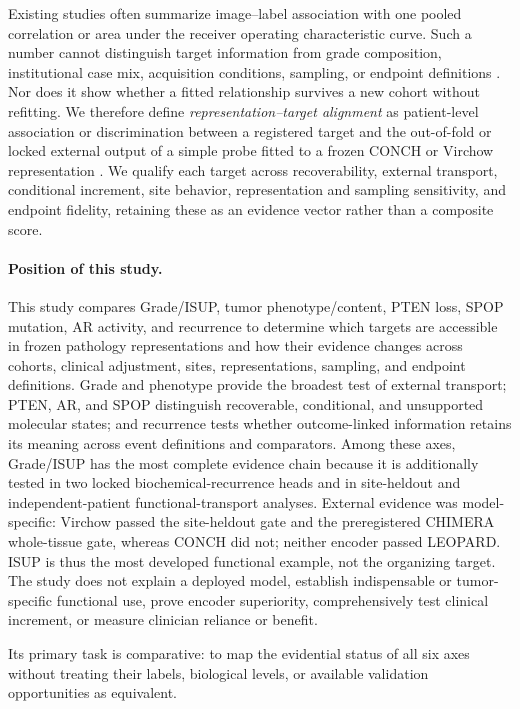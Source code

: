 Existing studies often summarize image--label association with one pooled correlation or
area under the receiver operating characteristic curve. Such a number cannot distinguish
target information from grade composition, institutional case mix, acquisition conditions,
sampling, or endpoint definitions \cite{dawood2026,neidlinger2025,pathorob2026}. Nor does it
show whether a fitted relationship survives a new cohort without refitting. We therefore
define \emph{representation--target alignment} as patient-level association or
discrimination between a registered target and the out-of-fold or locked external output of
a simple probe fitted to a frozen CONCH or Virchow representation
\cite{conch2023,virchow2023}. We qualify each target across recoverability, external transport,
conditional increment, site behavior, representation and sampling sensitivity, and endpoint
fidelity, retaining these as an evidence vector rather than a composite score.

\paragraph{Position of this study.}
This study compares Grade/ISUP, tumor phenotype/content, PTEN loss, SPOP mutation, AR
activity, and recurrence to determine which targets are accessible in frozen pathology
representations and how their evidence changes across cohorts, clinical adjustment, sites,
representations, sampling, and endpoint definitions. Grade and phenotype provide the
broadest test of external transport; PTEN, AR, and SPOP distinguish recoverable, conditional,
and unsupported molecular states; and recurrence tests whether outcome-linked information
retains its meaning across event definitions and comparators. Among these axes, Grade/ISUP
has the most complete evidence chain because it is additionally tested in two locked
biochemical-recurrence heads and in site-heldout and independent-patient functional-transport
analyses. External evidence was model-specific: Virchow passed the
site-heldout gate and the preregistered CHIMERA whole-tissue gate, whereas CONCH did not; neither
encoder passed LEOPARD. ISUP is thus the most developed functional example, not the organizing
target. The study does not explain a deployed model, establish indispensable or tumor-specific
functional use, prove encoder superiority, comprehensively test clinical increment, or measure
clinician reliance or benefit.

Its primary task is comparative: to map the evidential status of all six axes without treating
their labels, biological levels, or available validation opportunities as equivalent.

